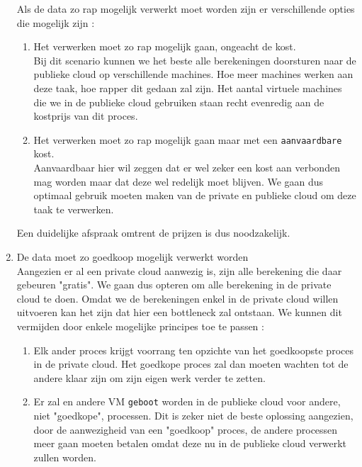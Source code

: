 \documentclass{article}
\begin{document}
\begin{enumerate}
Als de data zo rap mogelijk verwerkt moet worden zijn er verschillende opties die mogelijk zijn :
        \begin{enumerate}
            \item Het verwerken moet zo rap mogelijk gaan, ongeacht de kost. \\
            Bij dit scenario kunnen we het beste alle berekeningen doorsturen naar de publieke cloud op verschillende machines.  Hoe meer machines werken aan deze taak, hoe rapper dit gedaan zal zijn.  Het aantal virtuele machines die we in de publieke cloud gebruiken staan recht evenredig aan de kostprijs van dit proces.
            \item Het verwerken moet zo rap mogelijk gaan maar met een \texttt{aanvaardbare} kost.\\
Aanvaardbaar hier wil zeggen dat er wel zeker een kost aan verbonden mag worden maar dat deze wel redelijk moet blijven.  We gaan dus optimaal gebruik moeten maken van de private en publieke cloud om deze taak te verwerken.
        \end{enumerate}
Een duidelijke afspraak omtrent de prijzen is dus noodzakelijk.
    
    \item De data moet zo goedkoop mogelijk verwerkt worden \\
    
Aangezien er al een private cloud aanwezig is, zijn alle berekening die daar gebeuren "gratis".  We gaan dus opteren om alle berekening in de private cloud te doen.  Omdat we de berekeningen enkel in de private cloud willen uitvoeren kan het zijn dat hier een bottleneck zal ontstaan.  We kunnen dit vermijden door enkele mogelijke principes toe te passen :
        \begin{enumerate}
            \item Elk ander proces krijgt voorrang ten opzichte van het goedkoopste proces in de private cloud.  Het goedkope proces zal dan moeten wachten tot de andere klaar zijn om zijn eigen werk verder te zetten.
            \item Er zal en andere VM \texttt{geboot} worden in de publieke cloud voor andere, niet "goedkope", processen.  Dit is zeker niet de beste oplossing aangezien, door de aanwezigheid van een "goedkoop" proces, de andere processen meer gaan moeten betalen omdat deze nu in de publieke cloud verwerkt zullen worden.
        \end{enumerate}
\end{enumerate}
\end{document}
